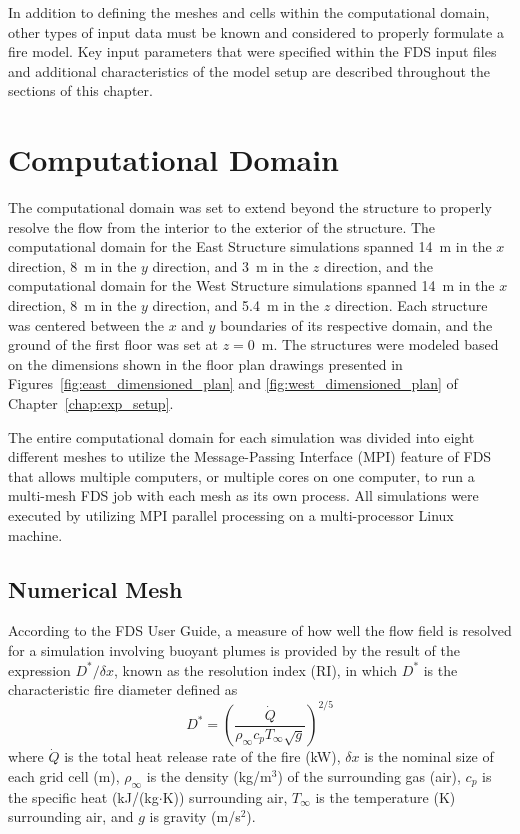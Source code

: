 In addition to defining the meshes and cells within the computational domain, other types of input data must be known and considered to properly formulate a fire model. Key input parameters that were specified within the FDS input files and additional characteristics of the model setup are described throughout the sections of this chapter.

\section{Computational Domain}
The computational domain was set to extend beyond the structure to properly resolve the flow from the interior to the exterior of the structure. The computational domain for the East Structure simulations spanned 14~m in the $x$ direction, 8~m in the $y$ direction, and 3~m in the $z$ direction, and the computational domain for the West Structure simulations spanned 14~m in the $x$ direction, 8~m in the $y$ direction, and 5.4~m in the $z$ direction. Each structure was centered between the $x$ and $y$ boundaries of its respective domain, and the ground of the first floor was set at $z=0$~m. The structures were modeled based on the dimensions shown in the floor plan drawings presented in Figures~\ref{fig:east_dimensioned_plan} and \ref{fig:west_dimensioned_plan} of Chapter~\ref{chap:exp_setup}. 

The entire computational domain for each simulation was divided into eight different meshes to utilize the Message-Passing Interface (MPI) feature of FDS that allows multiple computers, or multiple cores on one computer, to run a multi-mesh FDS job with each mesh as its own process. All simulations were executed by utilizing MPI parallel processing on a multi-processor Linux machine.

\subsection{Numerical Mesh}
\label{subsec:mesh}
According to the FDS User Guide, a measure of how well the flow field is resolved for a simulation involving buoyant plumes is provided by the result of the expression $D^*/\delta x$, known as the resolution index (RI), in which $D^*$ is the characteristic fire diameter defined as
\begin{equation}
\label{eq:Dstar}
	D^* = \left( \frac{\dot{Q}}{\rho_\infty c_p T_\infty \sqrt{g}}\right)^{2/5}
\end{equation}
where $\dot{Q}$ is the total heat release rate of the fire (kW), $\delta x$ is the nominal size of each grid cell (m), $\rho_\infty$ is the density (kg/m$^3$) of the surrounding gas (air), $c_p$ is the specific heat (kJ/(kg$\cdot$K)) surrounding air, $T_\infty$ is the temperature (K) surrounding air, and $g$ is gravity (m/s$^2$). 

